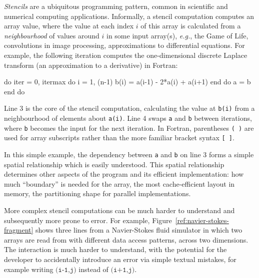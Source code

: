 \documentclass[9pt]{sigplanconf}
\theoremstyle{definition}
\newcommand{\eg}{\emph{e.g.}}
\begin{document}
\emph{Stencils} are a ubiquitous programming pattern, common in
scientific and numerical computing applications. Informally, a stencil
computation computes an array value, where the value at each index $i$ of
this array is calculated from a \emph{neighbourhood} of values around $i$ in
some input array(s), \eg{}, the Game of Life, convolutions in image
processing, approximations to differential equations. For example, the
following iteration computes the one-dimensional discrete Laplace
transform (an approximation to a derivative) in Fortran:
%
\begin{ExmVerbatim}
do iter = 0, itermax
   do i = 1, (n-1)
      b(i) = a(i-1) - 2*a(i) + a(i+1)
   end do
   a = b
end do
\end{ExmVerbatim}
%
Line 3 is the core of the stencil computation, calculating
the value at \texttt{b(i)} from a neighbourhood of elements about
\texttt{a(i)}. Line 4 swaps
\texttt{a} and \texttt{b} between iterations, where \texttt{b} becomes the
input for the next iteration. In Fortran, parentheses \texttt{( )} are used
for array subscripts rather than the more familiar bracket syntax \texttt{[ ]}.

In this simple example, the dependency between \texttt{a}
and \texttt{b} on line 3 forms a simple spatial relationship which is easily
understood. This spatial relationship determines other aspects of the
program and its efficient implementation: how much ``boundary'' is
needed for the array, the most cache-efficient layout in memory,
the partitioning shape for parallel implementations.

More complex stencil computations can be much harder to understand and
subsequently more prone to error. For example,
Figure~\ref{ref:navier-stokes-fragment} shows three lines from a
Navier-Stokes fluid simulator in which two arrays are read from with
different data access patterns, across two dimensions. The interaction
is much harder to understand, with the potential for the developer to
accidentally introduce an error via simple textual mistakes, for
example writing $\texttt{(i-1,j)}$ instead of $\texttt{(i+1,j)}$.
\end{document}
